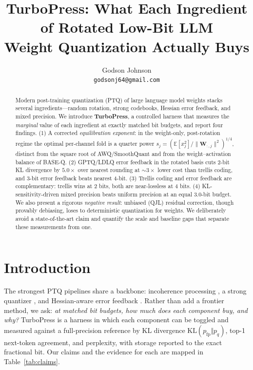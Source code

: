 \documentclass[10pt]{article}
\title{\textbf{TurboPress}: What Each Ingredient of Rotated Low-Bit LLM\\
Weight Quantization Actually Buys}
\author{Godson Johnson\\ \texttt{godsonj64@gmail.com}}
\date{}
\newcommand{\kl}{\mathrm{KL}}
\newcommand{\E}{\mathbb{E}}
\newcommand{\W}{\mathbf{W}}
\begin{document}
\maketitle

\begin{abstract}
Modern post-training quantization (PTQ) of large language model weights stacks
several ingredients---random rotation, strong codebooks, Hessian error feedback,
and mixed precision. We introduce \textbf{TurboPress}, a controlled harness that
measures the \emph{marginal} value of each ingredient at exactly matched bit
budgets, and report four findings. (1) A corrected \emph{equilibration exponent}:
in the weight-only, post-rotation regime the optimal per-channel fold is a
quarter power $s_j=(\E[x_j^2]/\lVert\W_{:,j}\rVert^2)^{1/4}$, distinct from the
square root of AWQ/SmoothQuant and from the weight--activation balance of BASE-Q.
(2) GPTQ/LDLQ error feedback in the rotated basis cuts 2-bit KL divergence by
$5.0\times$ over nearest rounding at $\sim\!3\times$ lower cost than trellis
coding, and 3-bit error feedback beats nearest 4-bit. (3) Trellis coding and
error feedback are complementary: trellis wins at 2 bits, both are near-lossless
at 4 bits. (4) KL-sensitivity-driven mixed precision beats uniform precision at
an equal 3.0-bit budget. We also present a rigorous \emph{negative result}:
unbiased (QJL) residual correction, though provably debiasing, loses to
deterministic quantization for weights. We deliberately avoid a state-of-the-art
claim and quantify the scale and baseline gaps that separate these measurements
from one.
\end{abstract}

\section{Introduction}
The strongest PTQ pipelines share a backbone: incoherence processing
\citep{chee2023quip,ashkboos2024quarot}, a strong quantizer
\citep{tseng2024quipsharp,tseng2024qtip}, and Hessian-aware error feedback
\citep{frantar2023gptq}. Rather than add a frontier method, we ask: \emph{at
matched bit budgets, how much does each component buy, and why?} TurboPress is a
harness in which each component can be toggled and measured against a
full-precision reference by KL divergence $\kl(p_{\text{fp}}\Vert p_q)$, top-1
next-token agreement, and perplexity, with storage reported to the exact
fractional bit. Our claims and the evidence for each are mapped in
Table~\ref{tab:claims}.
\end{document}
